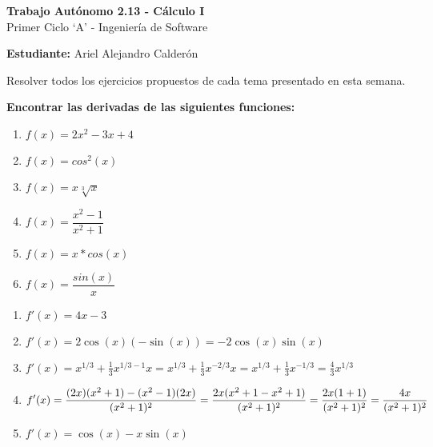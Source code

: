 \documentclass[answers]{exam} %
\begin{document}
\begin{center}
    \large\textbf{Trabajo Autónomo 2.13 - Cálculo I}\\[1em]
    \large Primer Ciclo \enquote*{A} - Ingeniería de Software\\[1em]
\end{center}

\vspace{0.5cm}
\large\textbf{Estudiante:} Ariel Alejandro Calderón
\vspace{0.5cm}

Resolver todos los ejercicios propuestos de cada tema presentado en esta semana.

\begin{questions}

    \question \large\textbf{Encontrar las derivadas de las siguientes funciones:}
    \begin{enumerate}[label=\alph*.]
        \item $\displaystyle f(x)=2x^2-3x+4$
        \item $\displaystyle f(x)=cos^2(x)$
        \item $\displaystyle f(x)=x\sqrt[3]{x}$
        \item $\displaystyle f(x)=\dfrac{x^2-1}{x^2+1}$
        \item $\displaystyle f(x)=x*cos(x)$
        \item $\displaystyle f(x)=\dfrac{sin(x)}{x}$
    \end{enumerate}
    \begin{solution}
        \begin{enumerate}[label=\alph*.]
            \item $\displaystyle f'(x)  = 4x - 3$ \\
            \item $\displaystyle f'(x)  = 2\cos(x)(-\sin(x)) = -2\cos(x)\sin(x)$ \\
            \item $\displaystyle f'(x)  = x^{1/3} + \frac{1}{3}x^{1/3-1}x = x^{1/3} + \frac{1}{3}x^{-2/3}x = x^{1/3} + \frac{1}{3}x^{-1/3} = \frac{4}{3}x^{1/3}$\\
            \item $\displaystyle f'(x) = \frac{(2x)(x^2 + 1) - (x^2 - 1)(2x)}{(x^2 + 1)^2} = \frac{2x(x^2 + 1 - x^2 + 1)}{(x^2 + 1)^2} \\ = \frac{2x(1 + 1)}{(x^2 + 1)^2} = \frac{4x}{(x^2 + 1)^2}$\\
            \item $\displaystyle f'(x) = \cos(x) - x \sin(x)$\\

\end{enumerate}
\end{solution}
\end{questions}
\end{document}
